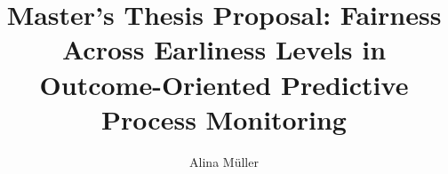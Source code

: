 \documentclass[authoryear,preprint,12pt]{elsarticle}
\begin{document}
\begin{frontmatter}



\title{Master’s Thesis Proposal: Fairness Across Earliness Levels in Outcome-Oriented Predictive Process Monitoring}


\author{Alina Müller} %









\end{frontmatter}
\end{document}
